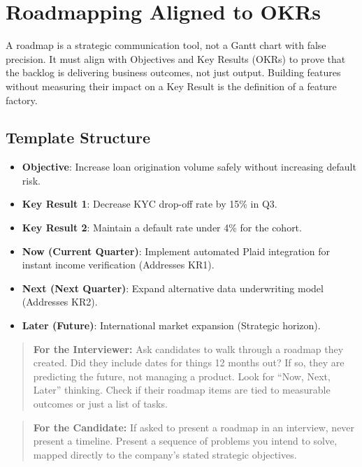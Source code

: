 \section{Roadmapping Aligned to OKRs}\label{roadmapping-aligned-to-okrs}

A roadmap is a strategic communication tool, not a Gantt chart with
false precision. It must align with Objectives and Key Results (OKRs) to
prove that the backlog is delivering business outcomes, not just output.
Building features without measuring their impact on a Key Result is the
definition of a feature factory.

\subsection{Template Structure}\label{template-structure}

\begin{itemize}
\tightlist
\item
  \textbf{Objective}: Increase loan origination volume safely without
  increasing default risk.
\item
  \textbf{Key Result 1}: Decrease KYC drop-off rate by 15\% in Q3.
\item
  \textbf{Key Result 2}: Maintain a default rate under 4\% for the
  cohort.
\item
  \textbf{Now (Current Quarter)}: Implement automated Plaid integration
  for instant income verification (Addresses KR1).
\item
  \textbf{Next (Next Quarter)}: Expand alternative data underwriting
  model (Addresses KR2).
\item
  \textbf{Later (Future)}: International market expansion (Strategic
  horizon).
\end{itemize}

\begin{quote}
\textbf{For the Interviewer:} Ask candidates to walk through a roadmap
they created. Did they include dates for things 12 months out? If so,
they are predicting the future, not managing a product. Look for ``Now,
Next, Later'' thinking. Check if their roadmap items are tied to
measurable outcomes or just a list of tasks.
\end{quote}

\begin{quote}
\textbf{For the Candidate:} If asked to present a roadmap in an
interview, never present a timeline. Present a sequence of problems you
intend to solve, mapped directly to the company's stated strategic
objectives.
\end{quote}

